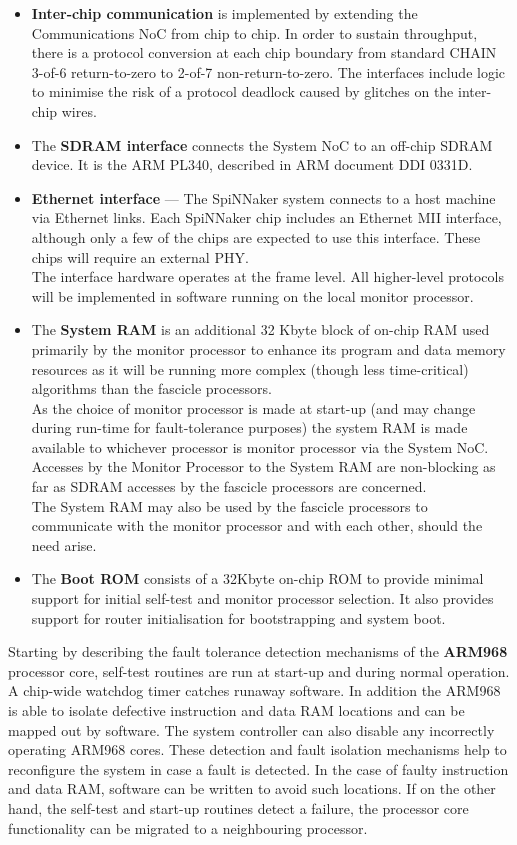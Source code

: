 \documentclass[a4paper, 11pt]{article}
\newcounter{subsubsubsection}[subsubsection]
\begin{document}
\begin{itemize}
	\item \textbf{Inter-chip  communication}  is  implemented  by  extending  the Communications NoC  from  chip  to chip.  In  order  to  sustain  throughput,  there  is  a  protocol  conversion  at  each  chip  boundary  from standard CHAIN 3-of-6 return-to-zero to 2-of-7 non-return-to-zero. The interfaces include logic to minimise the risk of a protocol deadlock caused by glitches on the inter-chip wires.
	\item The \textbf{SDRAM  interface}  connects  the System NoC  to  an off-chip SDRAM device.  It  is  the ARM PL340, described in ARM document DDI 0331D.
	\item \textbf{Ethernet interface} --- The  SpiNNaker  system  connects  to  a  host  machine  via  Ethernet  links.  Each  SpiNNaker  chip includes  an  Ethernet MII  interface,  although  only  a  few  of  the  chips  are  expected  to  use  this interface. These chips will require an external PHY.\\
	The interface hardware operates at the frame level. All higher-level protocols will be implemented in software running on the local monitor processor.
	\item The \textbf{System RAM} is an additional 32 Kbyte block of on-chip RAM used primarily by the monitor processor to enhance its program and data memory resources as it will be running more complex (though less time-critical) algorithms than the fascicle processors.\\
	As the choice of monitor processor is made at start-up (and may change during run-time for fault-tolerance  purposes)  the  system  RAM  is  made  available  to  whichever  processor  is  monitor processor via  the System NoC. Accesses by  the Monitor Processor  to  the System RAM are non-blocking as far as SDRAM accesses by the fascicle processors are concerned.\\
	The System RAM may also be used by  the fascicle processors to communicate with  the monitor processor and with each other, should the need arise.
	\item The \textbf{Boot ROM} consists of a 32Kbyte on-chip ROM to provide minimal support for initial self-test and monitor processor selection. It also provides support for router initialisation for bootstrapping and system boot.
\end{itemize}

Starting by describing the fault tolerance detection mechanisms of the \textbf{ARM968} processor core, self-test routines are run at start-up and during normal operation. A chip-wide watchdog timer catches runaway software. In addition the ARM968 is able to isolate defective instruction and data RAM locations and can be mapped out by software. The system controller can also disable any incorrectly operating ARM968 cores. These detection and fault isolation mechanisms help to reconfigure the system in case a fault is detected. In the case of faulty instruction and data RAM, software can be written to avoid such locations. If on the other hand, the self-test and start-up routines detect a failure, the processor core functionality can be migrated to a neighbouring processor.
\end{document}
